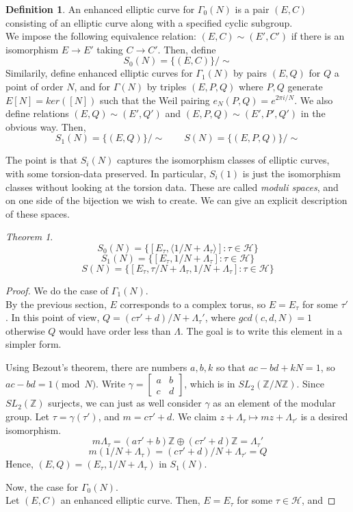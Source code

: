 \documentclass[11pt]{article}
\theoremstyle{plain}
\theoremstyle{definition}
\newtheorem{definition}{Definition}[section]
\theoremstyle{example}
\theoremstyle{remark}
\theoremstyle{lemma}
\theoremstyle{proposition}
\theoremstyle{Problem}
\theoremstyle{Solution}
\theoremstyle{theorem}
\newtheorem{theorem}{Theorem}[section]
\theoremstyle{corollary}
\begin{document}
\begin{definition}
An enhanced elliptic curve for $\Gamma_0(N)$ is a pair $(E, C)$ consisting of an elliptic curve along with a specified cyclic subgroup.\\
We impose the following equivalence relation: $(E,C) \sim (E',C')$ if there is an isomorphism $E\to E'$ taking $C\to C'$. Then, define
$$S_0(N) = \{(E,C)\}/\sim$$
Similarily, define enhanced elliptic curves for $\Gamma_1(N)$ by pairs $(E,Q)$ for $Q$ a point of order $N$, and for $\Gamma(N)$ by triples $(E, P, Q)$ where $P,Q$ generate $E[N] = ker([N])$ such that the Weil pairing $e_N(P,Q)=e^{2\pi i/N}$. We also define relations $(E,Q)\sim(E',Q')$ and $(E,P,Q) \sim (E',P',Q')$ in the obvious way. Then,
$$S_1(N)=\{(E,Q)\}/\sim \qquad S(N) = \{(E,P,Q)\}/\sim$$
\end{definition}
The point is that $S_i(N)$ captures the isomorphism classes of elliptic curves, with some torsion-data preserved. In particular, $S_i(1)$ is just the isomorphism classes without looking at the torsion data. These are called \textit{moduli spaces}, and on one side of the bijection we wish to create. We can give an explicit description of these spaces.
\begin{theorem}
$$S_0(N)=\{[E_\tau, \langle 1/N + \Lambda_\tau\rangle] : \tau\in\mathcal{H}\}$$
$$S_1(N)=\{[E_\tau,  1/N + \Lambda_\tau] : \tau\in\mathcal{H}\}$$
$$S(N)=\{[E_\tau,  \tau/N + \Lambda_\tau, 1/N + \Lambda_\tau] : \tau\in\mathcal{H}\}$$
\end{theorem}
\begin{proof}
We do the case of $\Gamma_1(N)$.\\
By the previous section, $E$ corresponds to a complex torus, so $E=E_\tau$ for some $\tau'$. In this point of view, $Q = (c\tau'+d)/N + \Lambda_\tau'$, where $gcd(c,d,N)=1$ otherwise $Q$ would have order less than $\Lambda$. The goal is to write this element in a simpler form.

Using Bezout's theorem, there are numbers $a,b,k$ so that $ac-bd+kN=1$, so $ac-bd=1\pmod{N}$. Write $\gamma=\begin{bmatrix}a & b \\ c & d\end{bmatrix}$, which is in $SL_2(\mathbb{Z}/N\mathbb{Z})$. Since $SL_2(\mathbb{Z})$ surjects, we can just as well consider $\gamma$ as an element of the modular group. Let $\tau = \gamma(\tau')$, and $m = c\tau'+d$. We claim $z+\Lambda_{\tau}\mapsto mz+\Lambda_{\tau'}$ is a desired isomorphism.\\
$$m\Lambda_\tau = (a\tau'+b)\mathbb{Z}\oplus(c\tau'+d)\mathbb{Z}=\Lambda_\tau'$$
$$m(1/N+\Lambda_{\tau}) = (c\tau'+d)/N+\Lambda_{\tau'}=Q$$
Hence, $(E,Q) = (E_\tau, 1/N+\Lambda_\tau)$ in $S_1(N)$.


Now, the case for $\Gamma_0(N)$.\\
Let $(E,C)$ an enhanced elliptic curve. Then, $E=E_\tau$ for some $\tau\in\mathcal{H}$, and 
\end{proof}
\end{document}
